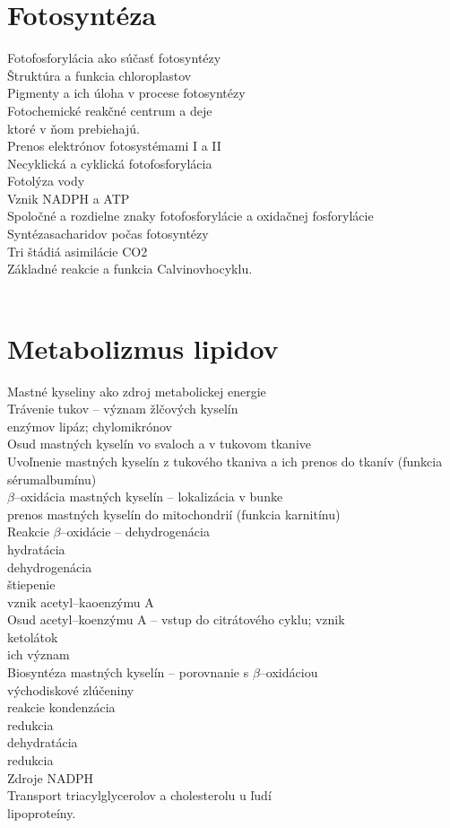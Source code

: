 \section{Fotosyntéza}
Fotofosforylácia ako súčasť fotosyntézy\\
Štruktúra a funkcia chloroplastov\\
Pigmenty a ich úloha v procese fotosyntézy\\
Fotochemické reakčné centrum a deje\\
\tab ktoré v ňom prebiehajú.\\
Prenos elektrónov fotosystémami I a II\\
Necyklická a cyklická fotofosforylácia\\
Fotolýza vody\\
Vznik NADPH a ATP\\
Spoločné a rozdielne znaky fotofosforylácie a oxidačnej fosforylácie\\
Syntézasacharidov počas fotosyntézy\\
Tri štádiá asimilácie CO2\\
Základné reakcie a funkcia Calvinovhocyklu.\\
\\
\section{Metabolizmus lipidov}
Mastné kyseliny ako zdroj metabolickej energie\\
Trávenie tukov -- význam žlčových kyselín\\
\tab enzýmov lipáz; chylomikrónov\\
Osud mastných kyselín vo svaloch a v tukovom tkanive\\
Uvoľnenie mastných kyselín z tukového tkaniva a ich prenos do tkanív (funkcia sérumalbumínu)\\
$\beta$--oxidácia mastných kyselín -- lokalizácia v bunke\\
\tab prenos mastných kyselín do mitochondrií (funkcia karnitínu)\\
Reakcie $\beta$--oxidácie -- dehydrogenácia\\
\tab hydratácia\\
\tab dehydrogenácia\\
\tab štiepenie\\
\tab vznik acetyl--kaoenzýmu A\\
Osud acetyl--koenzýmu A -- vstup do citrátového cyklu; vznik\\
ketolátok\\
\tab ich význam\\
Biosyntéza mastných kyselín -- porovnanie s $\beta$--oxidáciou\\
\tab východiskové zlúčeniny\\
\tab reakcie kondenzácia\\
\tab redukcia\\
\tab dehydratácia\\
\tab redukcia\\
Zdroje NADPH\\
Transport triacylglycerolov a cholesterolu u ľudí\\
\tab lipoproteíny.\\
\\


